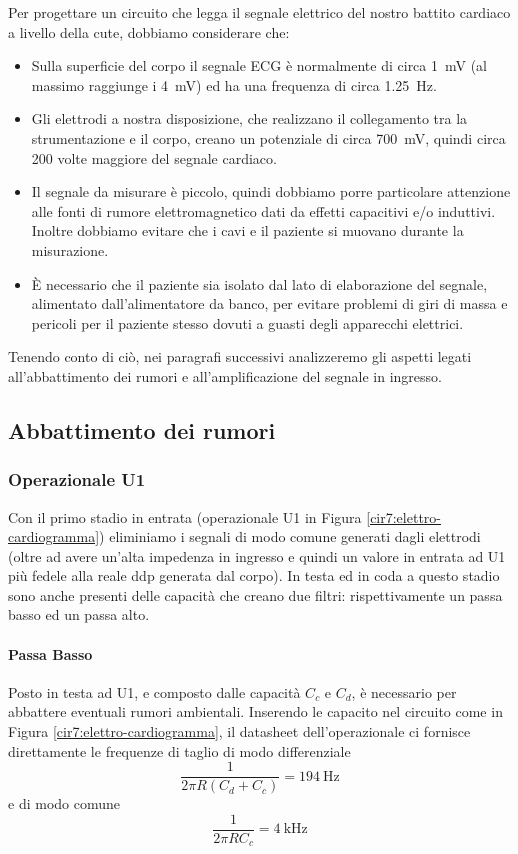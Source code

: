 Per progettare un circuito che legga il segnale elettrico del nostro battito cardiaco a livello della cute, dobbiamo considerare che:
\begin{itemize} [noitemsep]
	\item Sulla superficie del corpo il segnale ECG è normalmente di circa \SI{1}{mV} (al massimo raggiunge i \SI{4}{mV}) ed ha una frequenza di circa \SI{1.25}{\Hz}.
	\item Gli elettrodi a nostra disposizione, che realizzano il collegamento tra la strumentazione e il corpo, creano un potenziale di circa \SI{700}{\mV}, quindi circa \num{200} volte maggiore del segnale cardiaco.
	\item Il segnale da misurare è piccolo, quindi dobbiamo porre particolare attenzione alle fonti di rumore elettromagnetico dati da effetti capacitivi e/o induttivi. Inoltre dobbiamo evitare che i cavi e il paziente si muovano durante la misurazione.
	\item È necessario che il paziente sia isolato dal lato di elaborazione del segnale, alimentato dall'alimentatore da banco, per evitare problemi di giri di massa e pericoli per il paziente stesso dovuti a guasti degli apparecchi elettrici.
\end{itemize}

Tenendo conto di ciò, nei paragrafi successivi analizzeremo gli aspetti legati all'abbattimento dei rumori e all'amplificazione del segnale in ingresso.

\subsection{Abbattimento dei rumori}

\subsubsection*{Operazionale U1}

Con il primo stadio in entrata (operazionale U1 in Figura \ref{cir7:elettro-cardiogramma}) eliminiamo i segnali di modo comune generati dagli elettrodi (oltre ad avere un'alta impedenza in ingresso e quindi un valore in entrata ad U1 più fedele alla reale ddp generata dal corpo). In testa ed in coda a questo stadio sono anche presenti delle capacità che creano due filtri: rispettivamente un passa basso ed un passa alto.

\paragraph*{Passa Basso}
Posto in testa ad U1, e composto dalle capacità $C_c$ e $C_d$, è necessario per abbattere eventuali rumori ambientali. Inserendo le capacito nel circuito come in Figura \ref{cir7:elettro-cardiogramma}, il datasheet dell'operazionale ci fornisce direttamente le frequenze di taglio di modo differenziale
\begin{equation*}
	\frac{1}{2 \pi R ( C_d + C_c ) } = \SI{194}{\Hz}
\end{equation*}
e di modo comune
\begin{equation*}
	\frac{1}{2 \pi R C_c} = \SI{4}{\kHz}
\end{equation*}

